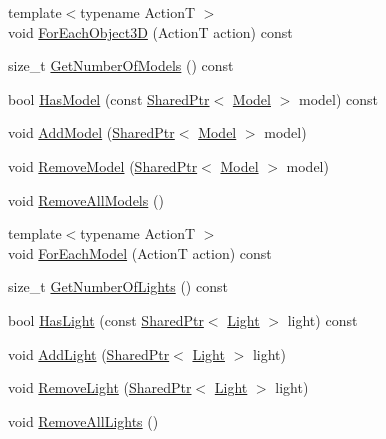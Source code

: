 \begin{DoxyCompactItemize}
\item 
{\footnotesize template$<$typename ActionT $>$ }\\void \hyperlink{classmage_1_1_world_aeaf99d59687121c072d483a98a726eff}{For\+Each\+Object3D} (ActionT action) const
\item 
size\+\_\+t \hyperlink{classmage_1_1_world_a6e04fdde74a2616746cdafd12537c4a7}{Get\+Number\+Of\+Models} () const
\item 
bool \hyperlink{classmage_1_1_world_a821d420241b2a94502b20e24595490df}{Has\+Model} (const \hyperlink{namespacemage_a1e01ae66713838a7a67d30e44c67703e}{Shared\+Ptr}$<$ \hyperlink{classmage_1_1_model}{Model} $>$ model) const
\item 
void \hyperlink{classmage_1_1_world_a4b7287a11ff316b029ec7727ed0d076d}{Add\+Model} (\hyperlink{namespacemage_a1e01ae66713838a7a67d30e44c67703e}{Shared\+Ptr}$<$ \hyperlink{classmage_1_1_model}{Model} $>$ model)
\item 
void \hyperlink{classmage_1_1_world_afad0c7024fcd304bb582bdc1d281c590}{Remove\+Model} (\hyperlink{namespacemage_a1e01ae66713838a7a67d30e44c67703e}{Shared\+Ptr}$<$ \hyperlink{classmage_1_1_model}{Model} $>$ model)
\item 
void \hyperlink{classmage_1_1_world_af3bae7b62192de9edda5e0567b73be93}{Remove\+All\+Models} ()
\item 
{\footnotesize template$<$typename ActionT $>$ }\\void \hyperlink{classmage_1_1_world_a8f9c130a358f6ce687d2948f477d4ef2}{For\+Each\+Model} (ActionT action) const
\item 
size\+\_\+t \hyperlink{classmage_1_1_world_a786420d8d8b97065ee591753b7f1541b}{Get\+Number\+Of\+Lights} () const
\item 
bool \hyperlink{classmage_1_1_world_acf4806658c635df685b4acc98febab2d}{Has\+Light} (const \hyperlink{namespacemage_a1e01ae66713838a7a67d30e44c67703e}{Shared\+Ptr}$<$ \hyperlink{classmage_1_1_light}{Light} $>$ light) const
\item 
void \hyperlink{classmage_1_1_world_a6dc45363e8740918b85788b8280ef403}{Add\+Light} (\hyperlink{namespacemage_a1e01ae66713838a7a67d30e44c67703e}{Shared\+Ptr}$<$ \hyperlink{classmage_1_1_light}{Light} $>$ light)
\item 
void \hyperlink{classmage_1_1_world_ad0a647509e52ba60d6f7ca4e1b463842}{Remove\+Light} (\hyperlink{namespacemage_a1e01ae66713838a7a67d30e44c67703e}{Shared\+Ptr}$<$ \hyperlink{classmage_1_1_light}{Light} $>$ light)
\item 
void \hyperlink{classmage_1_1_world_a5fafe529414d511e88b98ccd8e2f951f}{Remove\+All\+Lights} ()

\end{DoxyCompactItemize}
